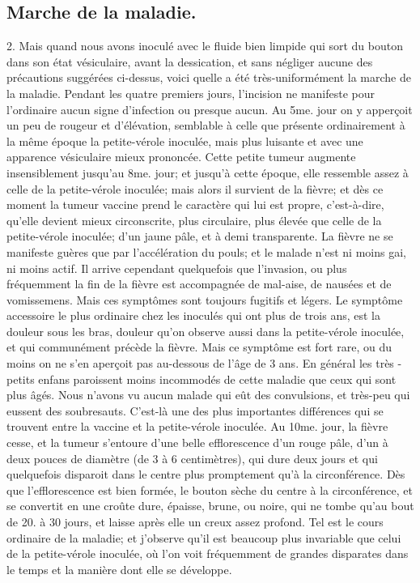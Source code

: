 \subsection{Marche de la maladie.}
2. Mais quand nous avons inoculé avec le fluide bien limpide qui sort du bouton dans son état vésiculaire, avant la dessication, et sans négliger aucune des précautions suggérées ci-dessus, voici quelle a été très-uniformément\setcounter{page}{80} la marche de la maladie. Pendant les quatre premiers jours, l'incision ne manifeste pour l'ordinaire aucun signe d'infection ou presque aucun. Au 5me. jour on y apperçoit un peu de rougeur et d'élévation, semblable à celle que présente ordinairement à la même époque la petite-vérole inoculée, mais plus luisante et avec une apparence vésiculaire mieux prononcée. Cette petite tumeur augmente insensiblement jusqu'au 8me. jour; et jusqu'à cette époque, elle ressemble assez à celle de la petite-vérole inoculée; mais alors il survient de la fièvre; et dès ce moment la tumeur vaccine prend le caractère qui lui est propre, c'est-à-dire, qu'elle devient mieux circonscrite, plus circulaire, plus élevée que celle de la petite-vérole inoculée; d'un jaune pâle, et à demi transparente.
La fièvre ne se manifeste guères que par l'accélération du pouls; et le malade n'est ni moins gai, ni moins actif. Il arrive cependant quelquefois que l'invasion, ou plus fréquemment la fin de la fièvre est accompagnée de mal-aise, de nausées et de vomissemens. Mais ces symptômes sont toujours fugitifs et légers. Le symptôme accessoire le plus ordinaire chez les inoculés qui ont plus de trois ans, est la douleur sous les bras,\setcounter{page}{81} douleur qu'on observe aussi dans la petite-vérole inoculée, et qui communément précède la fièvre. Mais ce symptôme est fort rare, ou du moins on ne s'en aperçoit pas au-dessous de l'âge de 3 ans. En général les très - petits enfans paroissent moins incommodés de cette maladie que ceux qui sont plus âgés. Nous n'avons vu aucun malade qui eût des convulsions, et très-peu qui eussent des soubresauts. C'est-là une des plus importantes différences qui se trouvent entre la vaccine et la petite-vérole inoculée.
Au 10me. jour, la fièvre cesse, et la tumeur s'entoure d'une belle efflorescence d'un rouge pâle, d'un à deux pouces de diamètre (de 3 à 6 centimètres), qui dure deux jours et qui quelquefois disparoit dans le centre plus promptement qu'à la circonférence. Dès que l'efflorescence est bien formée, le bouton sèche du centre à la circonférence, et se convertit en une croûte dure, épaisse, brune, ou noire, qui ne tombe qu'au bout de 20. à 30 jours, et laisse après elle un creux assez profond. Tel est le cours ordinaire de la maladie; et j'observe qu'il est beaucoup plus invariable que celui de la petite-vérole inoculée, où l'on voit fréquemment de grandes disparates dans le temps et la manière dont elle se développe.
\setcounter{page}{82}
